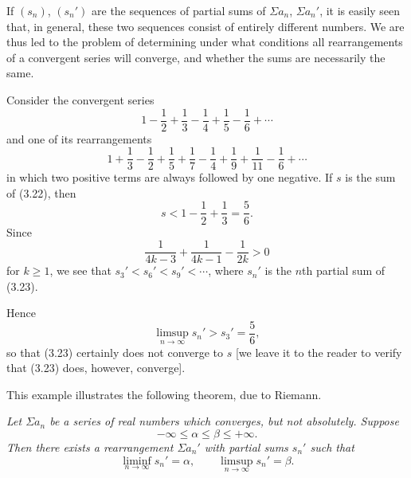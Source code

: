 If $(s_n)$, $(s_n')$ are the sequences of partial sums of $\Sigma a_n$,
$\Sigma a_n'$, it is easily seen that, in general, these two sequences consist
of entirely different numbers. We are thus led to the problem of determining
under what conditions all rearrangements of a convergent series will converge,
and whether the sums are necessarily the same.

Consider the convergent series
\begin{equation}
  1 - \frac12 + \frac13 - \frac14 + \frac15 - \frac16 + \cdots \tag{3.22}
\end{equation}
and one of its rearrangements
\begin{equation}
  1 + \frac13 - \frac12 + \frac15 + \frac17 - \frac14 + \frac19 + \frac{1}{11}
  - \frac16 + \cdots \tag{3.23}
\end{equation}
in which two positive terms are always followed by one negative. If $s$ is the
sum of (3.22), then
\[ s < 1 - \frac12 + \frac13 = \frac56. \]
Since
\[ \frac{1}{4k-3} + \frac{1}{4k-1} - \frac{1}{2k} > 0 \]
for $k \ge 1$, we see that $s_3' < s_6' < s_9' < \cdots$, where $s_n'$ is the
$n$th partial sum of (3.23).

Hence
\[ \limsup_{n\to\infty} s_n' > s_3' = \frac56, \]
so that (3.23) certainly does not converge to $s$ [we leave it to the reader to
verify that (3.23) does, however, converge].

This example illustrates the following theorem, due to Riemann.

\emph{Let $\Sigma a_n$ be a series of real numbers which converges, but not
absolutely. Suppose}
\[ -\infty \le \alpha \le \beta \le +\infty. \]
\emph{Then there exists a rearrangement $\Sigma a_n'$ with partial sums
$s_n'$ such that}
\begin{equation}
  \liminf_{n\to\infty} s_n' = \alpha, \qquad
  \limsup_{n\to\infty} s_n' = \beta. \tag{3.24}
\end{equation}

